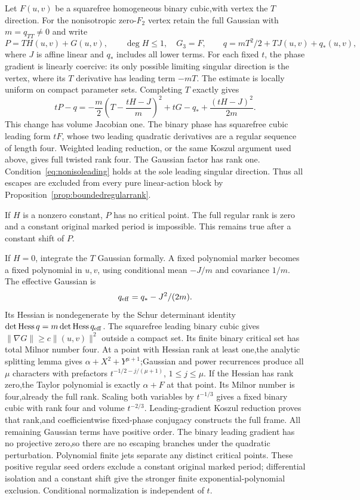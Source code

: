 \documentclass[11pt]{article}
\theoremstyle{definition}\newtheorem{definition}[theorem]{Definition}
\theoremstyle{remark}\newtheorem{remark}[theorem]{Remark}
\begin{document}
Let $F(u,v)$ be a squarefree homogeneous binary cubic,with vertex
the $T$ direction. For the nonisotropic zero-$F_2$ vertex retain the full Gaussian with
$m=q_{TT}\ne0$ and write
\[
 P=T H(u,v)+G(u,v),\qquad\deg H\le1,\quad G_3=F,
 \qquad q=mT^2/2+T J(u,v)+q_*(u,v),
\]
where $J$ is affine linear and $q_*$ includes all lower terms.
For each fixed $t$, the phase gradient is linearly coercive:
its only possible limiting singular direction is the vertex,
where its $T$ derivative has leading term $-mT$. The estimate
is locally uniform on compact parameter sets. Completing $T$
exactly gives
\[
 tP-q=-\frac m2\left(T-\frac{tH-J}{m}\right)^2
                    +tG-q_*+\frac{(tH-J)^2}{2m}.
\]
This change has volume Jacobian one. The binary phase has
squarefree cubic leading form $tF$, whose two leading quadratic
derivatives are a regular sequence of length four. Weighted
leading reduction, or the same Koszul argument used above,
gives full twisted rank four. The Gaussian factor has rank one.
Condition~\eqref{eq:nonisoleading} holds at the sole leading
singular direction. Thus all escapes are excluded from every
pure linear-action block by Proposition~\ref{prop:boundedregularrank}.

If $H$ is a nonzero constant, $P$ has no critical point.
The full regular rank is zero and a constant original marked
period is impossible. This remains true after a constant shift
of $P$.

If $H=0$, integrate the $T$ Gaussian formally. A fixed polynomial
marker becomes a fixed polynomial in $u,v$, using conditional
mean $-J/m$ and covariance $1/m$. The effective Gaussian is
\[
 q_{\rm eff}=q_*-J^2/(2m).
\]
Its Hessian is nondegenerate by the Schur determinant identity
$\det\operatorname{Hess}q=m\det\operatorname{Hess}q_{\rm eff}$.
The squarefree leading binary cubic gives
$\|\nabla G\|\ge c\|(u,v)\|^2$ outside a compact set.
Its finite binary critical set has total Milnor number four.
At a point with Hessian rank at least one,the analytic splitting
lemma gives $\alpha+X^2+Y^{\mu+1}$;Gaussian and power recurrences
produce all $\mu$ characters with prefactors
$t^{-1/2-j/(\mu+1)}$, $1\le j\le\mu$. If the Hessian has rank
zero,the Taylor polynomial is exactly $\alpha+F$ at that point.
Its Milnor number is four,already the full rank. Scaling both
variables by $t^{-1/3}$ gives a fixed binary cubic with rank four
and volume $t^{-2/3}$. Leading-gradient Koszul reduction proves
that rank,and coefficientwise fixed-phase conjugacy constructs
the full frame. All remaining Gaussian terms have positive order.
The binary leading gradient has no projective zero,so there are
no escaping branches under the quadratic perturbation. Polynomial
finite jets separate any distinct critical points. These positive
regular seed orders exclude a constant original marked period;
differential isolation and a constant shift give the stronger
finite exponential-polynomial exclusion. Conditional normalization
is independent of $t$.
\end{document}
